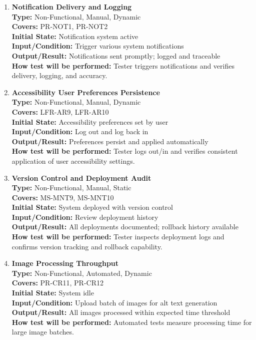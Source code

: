 \documentclass[12pt, titlepage]{article}
\begin{document}
\begin{enumerate}[label=NFR-ST \arabic*., wide=0pt, leftmargin=*]
  \item \textbf{Notification Delivery and Logging} \\[2mm]
    \textbf{Type:} Non-Functional, Manual, Dynamic \\
    \textbf{Covers:} PR-NOT1, PR-NOT2 \\
    \textbf{Initial State:} Notification system active \\
    \textbf{Input/Condition:} Trigger various system notifications \\
    \textbf{Output/Result:} Notifications sent promptly; logged and
    traceable \\[2mm]
    \textbf{How test will be performed:} Tester triggers
    notifications and verifies delivery, logging, and accuracy.

  \item \textbf{Accessibility User Preferences Persistence} \\[2mm]
    \textbf{Type:} Non-Functional, Manual, Dynamic \\
    \textbf{Covers:} LFR-AR9, LFR-AR10 \\
    \textbf{Initial State:} Accessibility preferences set by user \\
    \textbf{Input/Condition:} Log out and log back in \\
    \textbf{Output/Result:} Preferences persist and applied automatically \\[2mm]
    \textbf{How test will be performed:} Tester logs out/in and
    verifies consistent application of user accessibility settings.

  \item \textbf{Version Control and Deployment Audit} \\[2mm]
    \textbf{Type:} Non-Functional, Manual, Static \\
    \textbf{Covers:} MS-MNT9, MS-MNT10 \\
    \textbf{Initial State:} System deployed with version control \\
    \textbf{Input/Condition:} Review deployment history \\
    \textbf{Output/Result:} All deployments documented; rollback
    history available \\[2mm]
    \textbf{How test will be performed:} Tester inspects deployment
    logs and confirms version tracking and rollback capability.

  \item \textbf{Image Processing Throughput} \\[2mm]
    \textbf{Type:} Non-Functional, Automated, Dynamic \\
    \textbf{Covers:} PR-CR11, PR-CR12 \\
    \textbf{Initial State:} System idle \\
    \textbf{Input/Condition:} Upload batch of images for alt text generation \\
    \textbf{Output/Result:} All images processed within expected time
    threshold \\[2mm]
    \textbf{How test will be performed:} Automated tests measure
    processing time for large image batches.


\end{enumerate}
\end{document}
